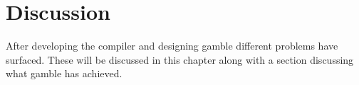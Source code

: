 \chapter{Discussion}
After developing the compiler and designing \gls{gamble} different problems have surfaced.
These will be discussed in this chapter along with a section discussing what \gls{gamble} has achieved.



